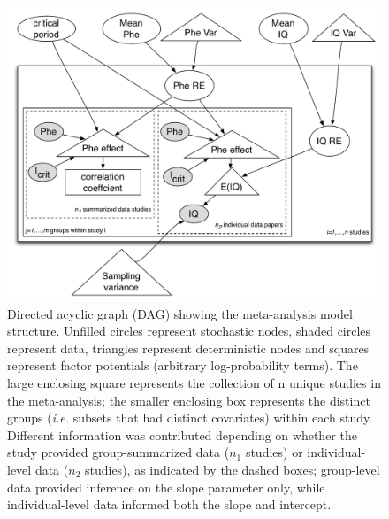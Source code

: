\documentclass{svjour3}                     %
\begin{document}
\begin{figure}[p]


    \includegraphics[width=\textwidth]{model.pdf}

    \caption{Directed acyclic graph (DAG) showing the meta-analysis model structure. Unfilled circles represent stochastic nodes, shaded circles represent data, triangles represent deterministic nodes and squares represent factor potentials (arbitrary log-probability terms). The large enclosing square represents the collection of n unique studies in the meta-analysis; the smaller enclosing box represents the distinct groups (\emph{i.e.} subsets that had distinct covariates) within each study. Different information was contributed depending on whether the study provided group-summarized data ($n_1$ studies) or individual-level data ($n_2$ studies), as indicated by the dashed boxes; group-level data provided inference on the slope parameter only, while individual-level data informed both the slope and intercept. } \label{fig:model}

\end{figure}
\end{document}
